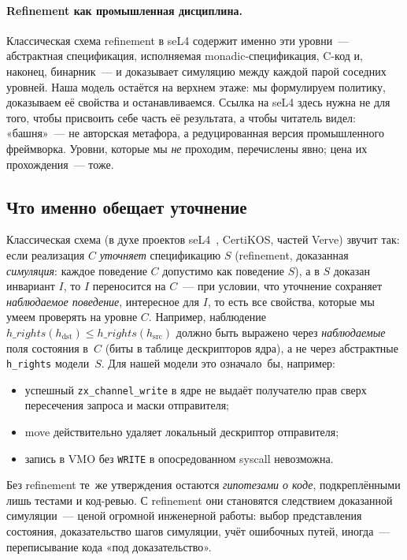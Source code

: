 \documentclass[11pt,a4paper]{article}
\begin{document}
\paragraph{Refinement как промышленная дисциплина.}
Классическая схема refinement в seL4 \cite{sel4overview} содержит
именно эти уровни~--- абстрактная спецификация, исполняемая
monadic-спецификация, C-код и, наконец, бинарник~--- и доказывает
симуляцию между каждой парой соседних уровней. Наша модель остаётся
на верхнем этаже: мы формулируем политику, доказываем её свойства и
останавливаемся. Ссылка на seL4 здесь нужна не для того, чтобы
присвоить себе часть её результата, а чтобы читатель видел:
«башня»~--- не авторская метафора, а редуцированная версия
промышленного фреймворка. Уровни, которые мы \emph{не} проходим,
перечислены явно; цена их прохождения~--- тоже.

\subsection{Что именно обещает уточнение}

Классическая схема (в духе проектов seL4~\cite{sel4}, CertiKOS, частей
Verve) звучит
так: если реализация $C$ \emph{уточняет} спецификацию
$S$ (refinement, доказанная \emph{симуляция}: каждое поведение $C$
допустимо как поведение $S$), а в $S$ доказан инвариант $I$, то $I$
переносится на $C$~--- при условии, что уточнение сохраняет
\emph{наблюдаемое поведение}, интересное для $I$, то есть все
свойства, которые мы умеем проверять на уровне $C$. Например, наблюдение
$h\_\mathit{rights}(h_{\mathrm{dst}}) \le h\_\mathit{rights}(h_{\mathrm{src}})$
должно быть выражено через \emph{наблюдаемые} поля состояния в~$C$
(биты в таблице дескрипторов ядра), а не через абстрактные
\texttt{h\_rights} модели~$S$. Для нашей модели это означало~бы, например:
\begin{itemize}[leftmargin=1.4em]
	\item успешный \texttt{zx\_channel\_write} в ядре не выдаёт получателю
	      прав сверх пересечения запроса и маски отправителя;
	\item move действительно удаляет локальный дескриптор отправителя;
	\item запись в VMO без \texttt{WRITE} в опосредованном syscall невозможна.
\end{itemize}
Без refinement те~же утверждения остаются \emph{гипотезами о коде},
подкреплёнными лишь тестами и код-ревью. С refinement они становятся
следствием доказанной симуляции~--- ценой огромной инженерной работы:
выбор представления состояния, доказательство шагов симуляции, учёт
ошибочных путей, иногда~--- переписывание кода «под доказательство».
\end{document}

